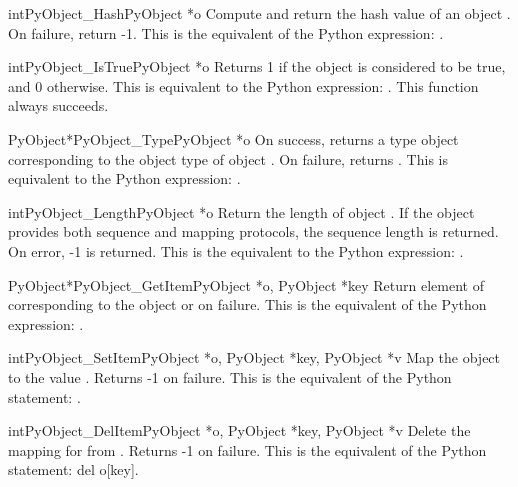      \begin{cfuncdesc}{int}{PyObject_Hash}{PyObject *o}
         Compute and return the hash value of an object .  On
         failure, return -1.  This is the equivalent of the Python
         expression: .
     \end{cfuncdesc}


     \begin{cfuncdesc}{int}{PyObject_IsTrue}{PyObject *o}
	 Returns 1 if the object  is considered to be true, and
	 0 otherwise. This is equivalent to the Python expression:
	 .
	 This function always succeeds.
     \end{cfuncdesc}
	 

     \begin{cfuncdesc}{PyObject*}{PyObject_Type}{PyObject *o}
	 On success, returns a type object corresponding to the object
	 type of object . On failure, returns {\NULL}.  This is
	 equivalent to the Python expression: .
     \end{cfuncdesc}

     \begin{cfuncdesc}{int}{PyObject_Length}{PyObject *o}
         Return the length of object .  If the object  provides
	 both sequence and mapping protocols, the sequence length is
	 returned. On error, -1 is returned.  This is the equivalent
	 to the Python expression: .
     \end{cfuncdesc}


     \begin{cfuncdesc}{PyObject*}{PyObject_GetItem}{PyObject *o, PyObject *key}
	 Return element of  corresponding to the object  or {\NULL}
	 on failure. This is the equivalent of the Python expression:
	 .
     \end{cfuncdesc}


     \begin{cfuncdesc}{int}{PyObject_SetItem}{PyObject *o, PyObject *key, PyObject *v}
	 Map the object  to the value .
	 Returns -1 on failure.  This is the equivalent
	 of the Python statement: .
     \end{cfuncdesc}


     \begin{cfuncdesc}{int}{PyObject_DelItem}{PyObject *o, PyObject *key, PyObject *v}
	 Delete the mapping for  from .  Returns -1
	 on failure.
	 This is the equivalent of the Python statement: del o[key].
     \end{cfuncdesc}


